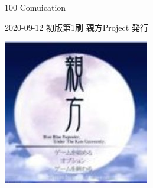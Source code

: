 \clearpage{\thispagestyle{empty}}
\begin{center}

\vspace{120pt}

\begin{sffamily}
\Large
100 Comuication
\normalsize
\end{sffamily}
\vspace{320pt}

\begin{sffamily}
2020-09-12
\hspace{5pt}
初版第1刷
\hspace{5pt}
親方Project
\hspace{5pt}
発行
\end{sffamily}

\includegraphics[width=0.3\linewidth]{images/oyakata.png}

\end{center}
